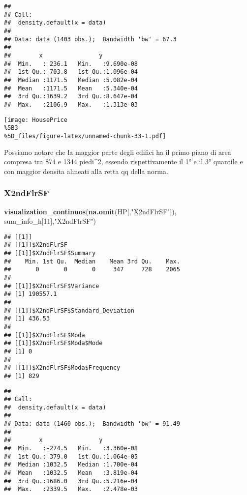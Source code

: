 \documentclass[
]{article}
\newenvironment{Shaded}{\begin{snugshade}}{\end{snugshade}}
\newcommand{\DecValTok}[1]{\textcolor[rgb]{0.00,0.00,0.81}{#1}}
\newcommand{\FunctionTok}[1]{\textcolor[rgb]{0.13,0.29,0.53}{\textbf{#1}}}
\newcommand{\NormalTok}[1]{#1}
\newcommand{\StringTok}[1]{\textcolor[rgb]{0.31,0.60,0.02}{#1}}
\begin{document}
\begin{verbatim}
## 
## Call:
##  density.default(x = data)
## 
## Data: data (1403 obs.);  Bandwidth 'bw' = 67.3
## 
##        x                y            
##  Min.   : 236.1   Min.   :9.690e-08  
##  1st Qu.: 703.8   1st Qu.:1.096e-04  
##  Median :1171.5   Median :5.082e-04  
##  Mean   :1171.5   Mean   :5.340e-04  
##  3rd Qu.:1639.2   3rd Qu.:8.647e-04  
##  Max.   :2106.9   Max.   :1.313e-03
\end{verbatim}

\texttt{[image: HousePrice\\\%5B3\\\%5D\_files/figure-latex/unnamed-chunk-33-1.pdf]}

Possiamo notare che la maggior parte degli edifici ha il primo piano di
area compresa tra 874 e 1344 piedi\^{}2, essendo rispettivamente il 1° e
il 3° quantile e con maggior densita alineati alla retta qq della norma.

\subsubsection{X2ndFlrSF}\label{x2ndflrsf}

\begin{Shaded}
\begin{Highlighting}[]
\FunctionTok{visualization\_continuos}\NormalTok{(}\FunctionTok{na.omit}\NormalTok{(HP[,}\StringTok{"X2ndFlrSF"}\NormalTok{]), sum\_info\_h[}\DecValTok{11}\NormalTok{],}\StringTok{"X2ndFlrSF"}\NormalTok{)}
\end{Highlighting}
\end{Shaded}

\begin{verbatim}
## [[1]]
## [[1]]$X2ndFlrSF
## [[1]]$X2ndFlrSF$Summary
##    Min. 1st Qu.  Median    Mean 3rd Qu.    Max. 
##       0       0       0     347     728    2065 
## 
## [[1]]$X2ndFlrSF$Variance
## [1] 190557.1
## 
## [[1]]$X2ndFlrSF$Standard_Deviation
## [1] 436.53
## 
## [[1]]$X2ndFlrSF$Moda
## [[1]]$X2ndFlrSF$Moda$Mode
## [1] 0
## 
## [[1]]$X2ndFlrSF$Moda$Frequency
## [1] 829
\end{verbatim}

\begin{verbatim}
## 
## Call:
##  density.default(x = data)
## 
## Data: data (1460 obs.);  Bandwidth 'bw' = 91.49
## 
##        x                y            
##  Min.   :-274.5   Min.   :3.360e-08  
##  1st Qu.: 379.0   1st Qu.:1.064e-05  
##  Median :1032.5   Median :1.700e-04  
##  Mean   :1032.5   Mean   :3.819e-04  
##  3rd Qu.:1686.0   3rd Qu.:5.216e-04  
##  Max.   :2339.5   Max.   :2.478e-03
\end{verbatim}
\end{document}
